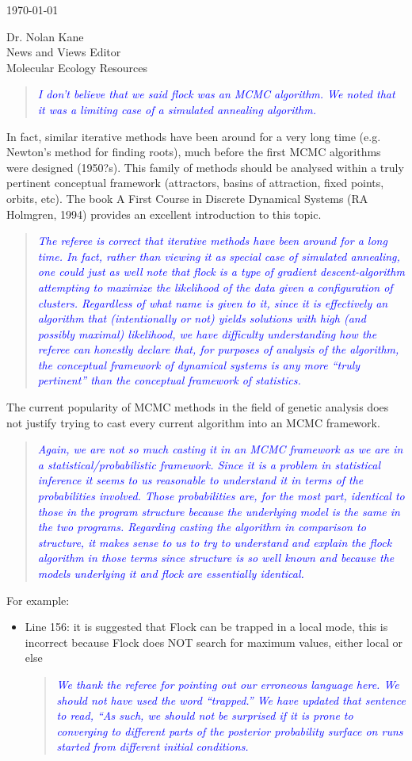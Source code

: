 \documentclass[11pt]{letter}
\newcommand{\reply}[1]{\begin{quotation}\small\sl\textcolor{blue}{#1}\end{quotation}}
\begin{document}
\begin{letter}{ \today 

Dr. Nolan Kane\\
News and Views Editor\\
Molecular Ecology Resources \\
}
\reply{I don't believe that we said {\sc flock} was an MCMC algorithm.  We noted that it was a limiting
 case of a simulated annealing algorithm.}

In fact, similar iterative methods have been around for a very long time (e.g. Newton's method for finding roots), much before the first MCMC algorithms were designed (1950?s). This family of methods should be analysed within a truly pertinent conceptual framework (attractors, basins of attraction, fixed points, orbits, etc). The book A First Course in Discrete Dynamical Systems (RA Holmgren, 1994) provides an excellent introduction to this topic. 
\reply{The referee is correct that iterative methods have been around for a long time.
In fact, rather than viewing it as special case of simulated annealing, one could just as well
note that {\sc flock} is a type of gradient descent-algorithm attempting to maximize the
likelihood of the data given a configuration of clusters.
Regardless of what name is given to it, since it is effectively an algorithm
that (intentionally or not) yields solutions with 
high (and possibly maximal) likelihood, we have difficulty understanding
how the referee can honestly declare that, for purposes of analysis of the algorithm,
the conceptual framework of dynamical systems is any more ``truly pertinent'' than
the conceptual framework of statistics.   }


The current popularity of MCMC methods in the field of genetic analysis does not justify trying to cast every current algorithm into an MCMC framework.

\reply{Again, we are not so much casting it in an MCMC framework as we are in a 
statistical/probabilistic framework.  Since it is a problem in statistical inference
it seems to us reasonable to understand it in terms of the probabilities involved. Those
probabilities are, for the most part, identical to those in the program {\sc structure} because
the underlying model is the same in the two programs.  Regarding casting the algorithm in
comparison to {\sc structure}, it makes sense to us to try to understand and explain the {\sc flock}
algorithm in those terms since {\sc structure} is so well known and because the models
underlying it and {\sc flock} are essentially identical.  }

For example:
\begin{itemize}
\item Line 156: it is suggested that Flock can be trapped in a local mode, this is incorrect because Flock does NOT search for maximum values, either local or else
\reply{We thank the referee for pointing out our erroneous language here.  We should not have used
the word ``trapped.''  We have updated that sentence to read, ``As such, we should not be surprised
if it is prone 
to converging to different parts of the posterior probability surface on runs started
from different initial conditions.}


\end{itemize}
\end{letter}
\end{document}
